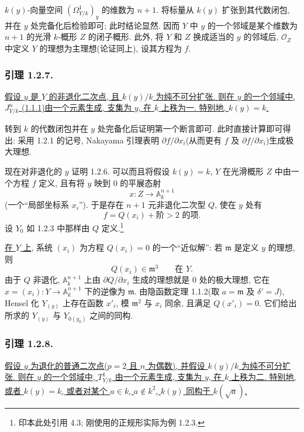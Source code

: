 $k(y)$-向量空间 $(\Omega^1_{Y/k})_y$ 的维数为 $n+1$. 将标量从 $k(y)$ 扩张到其代数闭包, 并在 $y$ 处完备化后检验即可; 此时结论显然. 因而 $Y$ 中 $y$ 的一个邻域是某个维数为 $n+1$ 的光滑 $k$-概形 $Z$ 的闭子概形. 此外, 将 $Y$ 和 $Z$ 换成适当的 $y$ 的邻域后, $\mathcal O_Z$ 中定义 $Y$ 的理想为主理想(论证同上), 设其方程为 $f$.

\subsubsection*{引理 1.2.7.}
\underline{假设 $y$ 是 $Y$ 的非退化二次点, 且 $k(y)/k$ 为纯不可分扩张. 则在 $y$ 的一个邻域中, $J^n_{Y/k}$ (1.1.1)由一个元素生成, 支集为 $y$, 在 $k$ 上秩为一. 特别地, $k(y)=k$.}

转到 $k$ 的代数闭包并在 $y$ 处完备化后证明第一个断言即可. 此时直接计算即可得出: 采用 1.2.1 的记号, Nakayama 引理表明 $\partial f/\partial x_i$(从而更有 $f$ 及 $\partial f/\partial x_i$)生成极大理想.

现在对非退化的 $y$ 证明 1.2.6. 可以而且将假设 $k(y)=k$, $Y$ 在光滑概形 $Z$ 中由一个方程 $f$ 定义, 且有将 $y$ 映到 $0$ 的平展态射
\[
x:Z\longrightarrow\mathbb A_k^{n+1}
\]
(一个“局部坐标系 $x_i$”). 于是存在 $n+1$ 元非退化二次型 $Q$, 使在 $y$ 处有
\[
f=Q(x_i)+\text{阶}>2\text{ 的项}.
\]
设 $Y_0$ 如 1.2.3 中那样由 $Q$ 定义.\footnote{印本此处引用 4.3; 刚使用的正规形实际为例 1.2.3.}

\underline{在 $Y$ 上}, 系统 $(x_i)$ 为方程 $Q(x_i)=0$ 的一个“近似解”: 若 $\mathfrak m$ 是定义 $y$ 的理想, 则
\[
Q(x_i)\in\mathfrak m^3\qquad\text{在 }Y.
\]
由于 $Q$ 非退化, $\mathbb A_k^{n+1}$ 上由 $\partial Q/\partial x_i$ 生成的理想就是 $0$ 处的极大理想, 它在 $x=(x_i):Y\to\mathbb A_k^{n+1}$ 下的逆像为 $\mathfrak m$. 由隐函数定理 1.1.2(取 $a=\mathfrak m$ 及 $\delta'=J$), Hensel 化 $Y_{(y)}$ 上存在函数 $x'_i$, 模 $\mathfrak m^2$ 与 $x_i$ 同余, 且满足 $Q(x'_i)=0$. 它们给出所求的 $Y_{(y)}$ 与 $Y_{0(y_0)}$ 之间的同构.

\subsubsection*{引理 1.2.8.}
\underline{假设 $y$ 为退化的普通二次点($p=2$ 且 $n$ 为偶数), 并假设 $k(y)/k$ 为纯不可分扩张. 则在 $y$ 的一个邻域中, $T^1_{Y/k}$ 由一个元素生成, 支集为 $y$, 在 $k$ 上秩为二. 特别地, 或者 $k(y)=k$, 或者对某个 $a\in k$, $a\notin k^2$, $k(y)$ 同构于 $k(\sqrt a)$.}

